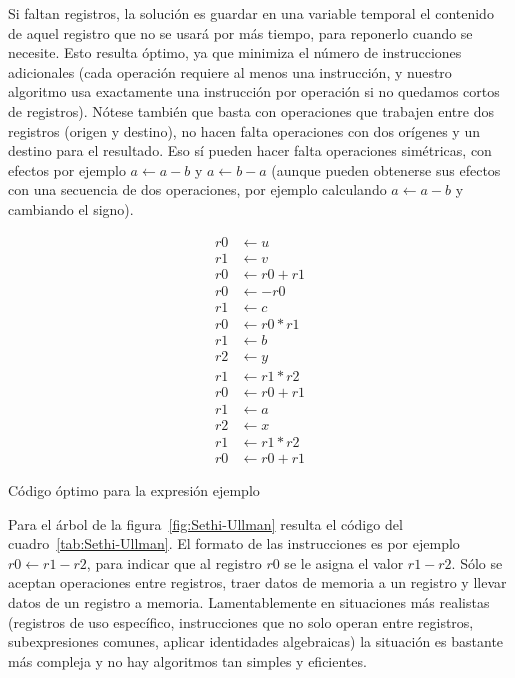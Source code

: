   Si faltan registros,
  la solución es guardar en una variable temporal
  el contenido de aquel registro que no se usará por más tiempo,
  para reponerlo cuando se necesite.
  Esto resulta óptimo,
  ya que minimiza el número de instrucciones adicionales
  (cada operación requiere al menos una instrucción,
   y nuestro algoritmo usa exactamente una instrucción por operación
   si no quedamos cortos de registros).
  Nótese también que basta con operaciones
  que trabajen entre dos registros
  (origen y destino),
  no hacen falta operaciones con dos orígenes
  y un destino para el resultado.
  Eso sí pueden hacer falta operaciones simétricas,
  con efectos por ejemplo \(a \leftarrow a - b\)
  y \(a \leftarrow b - a\)
  (aunque pueden obtenerse sus efectos
   con una secuencia de dos operaciones,
   por ejemplo calculando \(a \leftarrow a - b\)
   y cambiando el signo).


  \begin{table}[htbp]
    \begin{align*}
      r0 &\leftarrow u	     \\
      r1 &\leftarrow v	     \\
      r0 &\leftarrow r0 + r1 \\
      r0 &\leftarrow -r0     \\
      r1 &\leftarrow c	     \\
      r0 &\leftarrow r0 * r1 \\
      r1 &\leftarrow b	     \\
      r2 &\leftarrow y	     \\
      r1 &\leftarrow r1 * r2 \\
      r0 &\leftarrow r0 + r1 \\
      r1 &\leftarrow a	     \\
      r2 &\leftarrow x	     \\
      r1 &\leftarrow r1 * r2 \\
      r0 &\leftarrow r0 + r1
    \end{align*}
    \caption{Código óptimo para la expresión ejemplo}
    \label{tab:Sethi-Ullman}
  \end{table}
  Para el árbol de la figura~\ref{fig:Sethi-Ullman}
  resulta el código del cuadro~\ref{tab:Sethi-Ullman}.
  El formato de las instrucciones
  es por ejemplo \(r0 \leftarrow r1 - r2\),
  para indicar que al registro \(r0\)
  se le asigna el valor \(r1 - r2\).
  Sólo se aceptan operaciones entre registros,
  traer datos de memoria a un registro
  y llevar datos de un registro a memoria.
  Lamentablemente en situaciones más realistas
  (registros de uso específico,
   instrucciones que no solo operan entre registros,
   subexpresiones comunes,
   aplicar identidades algebraicas)
  la situación es bastante más compleja
  y no hay algoritmos tan simples y eficientes.

